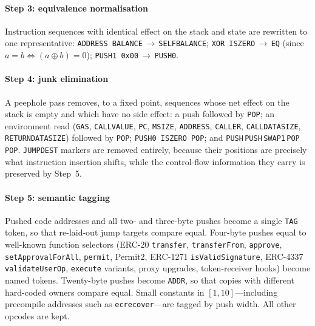 \paragraph{Step 3: equivalence normalisation} Instruction sequences with identical effect on the stack and state are rewritten to one representative: \texttt{ADDRESS BALANCE}$\,\to\,$\texttt{SELFBALANCE}; \texttt{XOR ISZERO}$\,\to\,$\texttt{EQ} (since $a=b \Leftrightarrow (a \oplus b)=0$); \texttt{PUSH1 0x00}$\,\to\,$\texttt{PUSH0}.

\paragraph{Step 4: junk elimination} A peephole pass removes, to a fixed point, sequences whose net effect on the stack is empty and which have no side effect: a push followed by \texttt{POP}; an environment read (\texttt{GAS}, \texttt{CALLVALUE}, \texttt{PC}, \texttt{MSIZE}, \texttt{ADDRESS}, \texttt{CALLER}, \texttt{CALLDATASIZE}, \texttt{RETURNDATASIZE}) followed by \texttt{POP}; \texttt{PUSH0 ISZERO POP}; and \texttt{PUSH}$\,$\texttt{PUSH}$\,$\texttt{SWAP1}$\,$\texttt{POP}$\,$\texttt{POP}. \texttt{JUMPDEST} markers are removed entirely, because their positions are precisely what instruction insertion shifts, while the control-flow information they carry is preserved by Step~5.

\paragraph{Step 5: semantic tagging} Pushed code addresses and all two- and three-byte pushes become a single \texttt{TAG} token, so that re-laid-out jump targets compare equal. Four-byte pushes equal to well-known function selectors (ERC-20 \texttt{transfer}, \texttt{transferFrom}, \texttt{approve}, \texttt{setApprovalForAll}, \texttt{permit}, Permit2, ERC-1271 \texttt{isValidSignature}, ERC-4337 \texttt{validateUserOp}, \texttt{execute} variants, proxy upgrades, token-receiver hooks) become named tokens. Twenty-byte pushes become \texttt{ADDR}, so that copies with different hard-coded owners compare equal. Small constants in $[1,10]$---including precompile addresses such as \texttt{ecrecover}---are tagged by push width. All other opcodes are kept.

